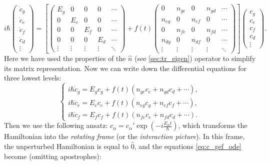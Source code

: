 \begin{equation*}
i\hbar \left(
\begin{matrix}
\dot c_g \\
\dot c_e\\
\dot c_f\\
\dot c_d\\
\vdots
\end{matrix}
\right) = 
\left[\left(
\begin{matrix}
E_g & 0 & 0 & 0 & \cdots\\
0 &E_e & 0 & 0 & \cdots\\
0 & 0 & E_f & 0 & \cdots\\
0 & 0 & 0 & E_d & \cdots\\
\vdots&\vdots&\vdots&\vdots& \ddots
\end{matrix}
\right)
+
f(t)
\left(
\begin{matrix}
0          & n_{ge} & 0         & n_{gd} & \cdots\\
n_{eg} & 0          & n_{ef} & 0         & \cdots\\
0          & n_{fe}  & 0         & n_{fd} & \cdots\\
n_{dg} & 0          & n_{df} & 0         & \cdots\\
\vdots&\vdots&\vdots&\vdots& \ddots
\end{matrix}
\right)\right]
\left(
\begin{matrix}
c_g\\
c_e\\
c_f\\
c_d\\
\vdots
\end{matrix}
\right).
\end{equation*}
Here we have used the properties of the $\hat n$ (see \autoref{sec:tr_eigen}) operator to simplify its matrix representation. Now we can write down the differential equations for three lowest levels:
\begin{equation}
\begin{cases}
i\hbar \dot c_g = E_g c_g + f(t) (n_{ge} c_e + n_{gd} c_d + \cdots),\\
i\hbar \dot c_e = E_e c_e + f(t) (n_{eg} c_g + n_{ef} c_f + \cdots),\\
i\hbar \dot c_f = E_f c_f + f(t) (n_{fe} c_e + n_{fd} c_d + \cdots).
\end{cases}
\label{eq:c_gef_ode}
\end{equation}
Then we use the following ansatz: $c_\alpha = c_\alpha' \exp( - i \frac{E_\alpha t}{\hbar})$, which transforms the Hamiltonian into the \textit{rotating frame} (or the \textit{interaction picture}). In this frame, the unperturbed Hamiltonian is equal to $\hat 0$, and the equations \eqref{eq:c_gef_ode} become (omitting apostrophes):

